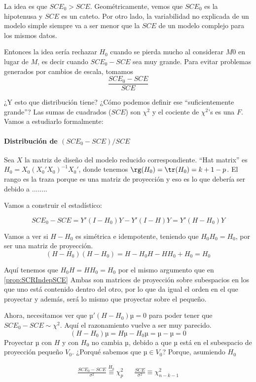 La idea es que $SCE_0 > SCE$. Geométricamente, vemos que $SCE_0$ es la hipotenusa y $SCE$ es un cateto. Por otro lado, la variabilidad no explicada de un modelo simple siempre va a ser menor que la $SCE$ de un modelo complejo para los mismos datos.

Entonces la idea sería rechazar $H_0$ cuando se pierda mucho al considerar $M0$ en lugar de $M$, es decir cuando $SCE_0 - SCE$ sea muy grande. Para evitar problemas generados por cambios de escala, tomamos \[\frac{SCE_0 - SCE}{SCE}\]

¿Y esto que distribución tiene? ¿Cómo podemos definir ese ``suficientemente grande''? Las sumas de cuadrados ($SCE$) son $\chi^2$ y el cociente de $\chi^2$'s es una $F$. Vamos a estudiarlo formalmente:


\paragraph{Distribución de $(SCE_0 - SCE)/SCE$}

Sea $X$ la matriz de diseño del modelo reducido correspondiente. ``Hat matrix'' es $H_0 = X_0(X_0'X_0)^{-1}X_0'$, donde tenemos $\rg(H_0) = \tr(H_0) = k+1-p$. El rango es la traza porque es una matriz de proyección y eso es lo que debería ser debido a ........

Vamos a construir el estadístico:

\[
SCE_0 - SCE = Y'(I-H_0)Y - Y'(I-H)Y = Y'(H-H_0)Y
\]

Vamos a ver si $H-H_0$ es simétrica e idempotente, teniendo que $H_0H_0 = H_0$, por ser una matriz de proyección.
\[
(H-H_0)(H-H_0) = H - H_0H - HH_0 + H_0 = H_0
\]

Aquí tenemos que  $H_0H = HH_0 = H_0$ por el mismo argumento que en \ref{prop:SCRIndepSCE} Ambas son matrices de proyección sobre subespacios en los que uno está contenido dentro del otro, por lo que da igual el orden en el que proyectar y además, será lo mismo que proyectar sobre el pequeño.

Ahora, necesitamos ver que $µ'(H-H_0)µ = 0$ para poder tener que $SCE_0 - SCE \sim \chi^2$. Aquí el razonamiento vuelve a ser muy parecido.
\[(H-H_0)µ = Hµ - H_0µ = µ-µ = 0\]
Proyectar $µ$ con $H$ y con $H_0$ no cambia $µ$, debido a que $µ$ está en el subespacio de proyección pequeño $V_0$. ¿Porqué sabemos que $µ∈V_0$? Porque, asumiendo $H_0$

\[
\begin{array}{lcr} \displaystyle\frac{SCE_0 - SCE}{σ^2} \overset{H_0}{\equiv} \chi^2_{p} && \displaystyle\frac{SCE}{σ^2} \equiv \chi^2_{n-k-1}\end{array}
\]

